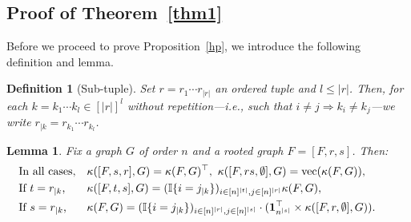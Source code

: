 \documentclass{article}
\theoremstyle{plain}
\newtheorem{Lemma}{Lemma}
\newtheorem{Definition}{Definition}
\DeclareMathOperator{\vect}{vec}
\begin{document}
\subsection{Proof of Theorem~\protect\ref{thm1}}%
Before we proceed to prove Proposition~\ref{hp}, we introduce the following definition and lemma.
\begin{Definition}[Sub-tuple]%
Set $r=r_1\cdots r_{|r|}$ an ordered tuple and $l\leq |r|$. Then, for each $k=k_1\cdots k_l\in [|r|]^l$ without repetition---i.e., such that $i\neq j\Rightarrow k_i\neq k_j$---we write $r_{|k}= r_{k_1}\cdots r_{k_l}$.
\end{Definition}
\begin{Lemma}%
\label{lem}
Fix a graph $G$ of order $n$ and a rooted graph $F=[F,r,s]$. Then:
\vspace{-.5\baselineskip}
\begin{align*}
&\text{In all cases,}&&
\kappa([F,s,r],G)=\kappa(F,G)^\top,\ 
\kappa([F,rs,\emptyset],G)=\vect(\kappa(F,G)),\\
&\text{If $t= r_{|k}$,}&&
\kappa([F,t,s],G)=(\mathbb{I}\{i=j_{|k}\})_{i\in[n]^{|t|},j\in[n]^{|r|}}\kappa(F,G),\qquad\\
&\text{If $s=r_{|k}$,}&&
\kappa(F,G)=(\mathbb{I}\{i=j_{|k}\})_{i\in[n]^{|r|},j\in[n]^{|s|}}\cdot ({\bf 1}_{n^{|s|}}^\top\times \kappa([F,r,\emptyset],G)).\qquad
\end{align*}
\end{Lemma}
\end{document}
